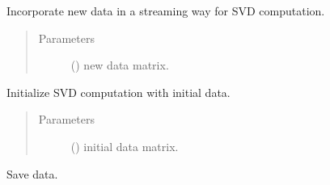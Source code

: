 \documentclass[letterpaper,10pt,english]{sphinxmanual}
\begin{document}
\begin{fulllineitems}
\begin{quote}
\begin{description}
\begin{itemize}
\end{itemize}

\end{description}\end{quote}

\begin{fulllineitems}
\label{\detokenize{index:pyparsvd.parsvd_parallel.ParSVD_Parallel.incorporate_data}}
\sphinxAtStartPar
Incorporate new data in a streaming way for SVD computation.
\begin{quote}\begin{description}
\item[{Parameters}] \leavevmode
\sphinxAtStartPar
{} () \textendash{} new data matrix.

\end{description}\end{quote}

\end{fulllineitems}


\begin{fulllineitems}
\label{\detokenize{index:pyparsvd.parsvd_parallel.ParSVD_Parallel.initialize}}
\sphinxAtStartPar
Initialize SVD computation with initial data.
\begin{quote}\begin{description}
\item[{Parameters}] \leavevmode
\sphinxAtStartPar
{} () \textendash{} initial data matrix.

\end{description}\end{quote}

\end{fulllineitems}


\begin{fulllineitems}
\label{\detokenize{index:pyparsvd.parsvd_parallel.ParSVD_Parallel.save}}
\sphinxAtStartPar
Save data.

\end{fulllineitems}


\end{fulllineitems}
\end{document}
